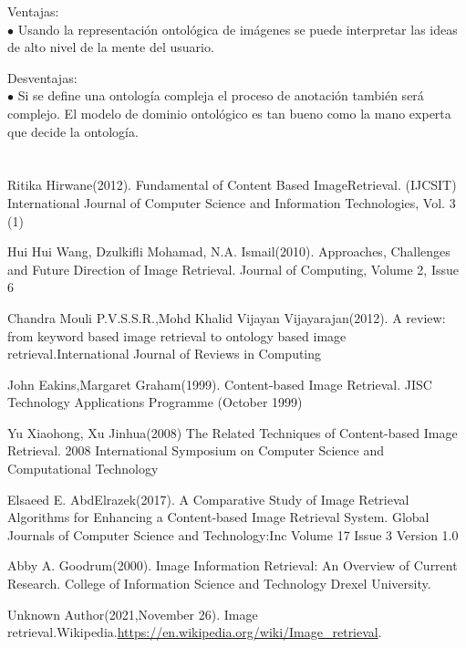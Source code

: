 \documentclass{llncs}
\begin{document}
Ventajas:\\
\noindent$\bullet$ Usando la representaci\'on ontol\'ogica  de im\'agenes se puede interpretar las ideas de alto nivel de la mente del usuario.



Desventajas:\\
$\bullet$
Si se define una ontolog\'ia compleja el proceso de anotaci\'on tambi\'en ser\'a complejo. El modelo de dominio ontol\'ogico es tan bueno 
como la mano experta que decide la ontolog\'ia.

\newpage

\chapter*{}
\begin{thebibliography}{}
    Ritika Hirwane(2012).
    Fundamental of Content Based ImageRetrieval.
    (IJCSIT) International Journal of Computer Science and Information Technologies, Vol. 3 (1)
    
    Hui Hui Wang, Dzulkifli Mohamad, N.A. Ismail(2010).
    Approaches, Challenges and Future Direction
    of Image Retrieval.
    Journal of Computing, Volume 2, Issue 6
    
    Chandra Mouli P.V.S.S.R.,Mohd Khalid
    Vijayan Vijayarajan(2012).
    A review: from keyword based image retrieval to ontology 
    based image retrieval.International Journal of Reviews in Computing  
    
    John Eakins,Margaret Graham(1999).
    Content-based Image Retrieval.
    JISC Technology Applications Programme (October 1999)

    
    Yu Xiaohong, Xu Jinhua(2008)
    The Related Techniques of Content-based Image Retrieval.
    2008 International Symposium on Computer Science and Computational Technology
    
    Elsaeed E. AbdElrazek(2017).
    A Comparative Study of Image Retrieval Algorithms for
    Enhancing a Content-based Image Retrieval System.
    Global Journals  of Computer Science and Technology:Inc Volume 17 Issue 3 Version 1.0

    Abby A. Goodrum(2000).
    Image Information Retrieval: An Overview of Current Research.
    College of Information Science and Technology Drexel University.

    Unknown Author(2021,November 26).
    Image retrieval.Wikipedia.\url{https://en.wikipedia.org/wiki/Image_retrieval}.
    
\end{thebibliography}
\end{document}
